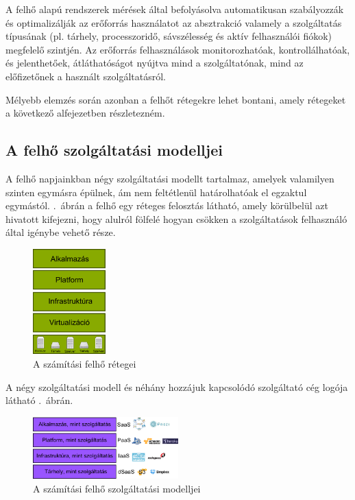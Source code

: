 A felhő alapú rendszerek mérések által befolyásolva automatikusan szabályozzák és optimalizálják az erőforrás használatot az absztrakció valamely a szolgáltatás típusának (pl. tárhely, processzoridő, sávszélesség és aktív felhasználói fiókok) megfelelő szintjén. Az erőforrás felhasználások monitorozhatóak, kontrollálhatóak, és jelenthetőek, átláthatóságot nyújtva mind a szolgáltatónak, mind az előfizetőnek a használt szolgáltatásról.

Mélyebb elemzés során azonban a felhőt rétegekre lehet bontani, amely rétegeket a következő alfejezetben részletezném.

\subsection{A felhő szolgáltatási modelljei}

A felhő napjainkban négy szolgáltatási modellt tartalmaz, amelyek valamilyen szinten egymásra épülnek, ám nem feltétlenül határolhatóak el egzaktul egymástól. .~ábrán a felhő egy réteges felosztás látható, amely körülbelül azt hivatott kifejezni, hogy alulról fölfelé hogyan csökken a szolgáltatások felhasználó által igénybe vehető része.


\begin{figure}[h!]
\centering
\includegraphics[width=0.25\textwidth]{figures/cloud_retegek.png}
\caption{A számítási felhő rétegei \label{fig:cloud_retegek}}
\end{figure}

A négy szolgáltatási modell és néhány hozzájuk kapcsolódó szolgáltató cég logója látható .~ábrán.

\begin{figure}[h!]
\centering
\includegraphics[width=0.5\textwidth]{figures/cloud_service_models.png}
\caption{A számítási felhő szolgáltatási modelljei \label{fig:cloud_service_models}}
\end{figure}
 

